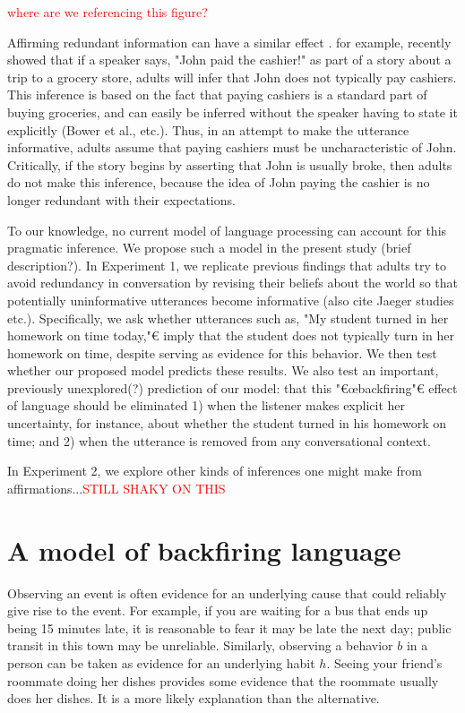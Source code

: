 \documentclass[10pt,letterpaper]{article}
\newcommand{\red}[1]{\textcolor{Red}{#1}}
\begin{document}
\red{where are we referencing this figure?}

Affirming redundant information can have a similar effect \cite{Gruenfeld1992, Kravtchenko2015}.  
 for example, recently showed that if a speaker says, "John paid the cashier!" as part of a story about a trip to a grocery store, adults will infer that John does not typically pay cashiers.  This inference is based on the fact that paying cashiers is a standard part of buying groceries, and can easily be inferred without the speaker having to state it explicitly (Bower et al., etc.).  Thus, in an attempt to make the utterance informative, adults assume that paying cashiers must be uncharacteristic of John.  Critically, if the story begins by asserting that John is usually broke, then adults do not make this inference, because the idea of John paying the cashier is no longer redundant with their expectations.

To our knowledge, no current model of language processing can account for this pragmatic inference.  We propose such a model in the present study (brief description?).  In Experiment 1, we replicate previous findings that adults try to avoid redundancy in conversation by revising their beliefs about the world so that potentially uninformative utterances become informative \cite{Kravtchenko2015} (also cite Jaeger studies etc.).  Specifically, we ask whether utterances such as, "My student turned in her homework on time today,"€ imply that the student does not typically turn in her homework on time, despite serving as evidence for this behavior.  We then test whether our proposed model predicts these results.  We also test an important, previously unexplored(?) prediction of our model: that this "€œbackfiring"€ effect of language should be eliminated 1) when the listener makes explicit her uncertainty, for instance, about whether the student turned in his homework on time; and 2) when the utterance is removed from any conversational context.

In Experiment 2, we explore other kinds of inferences one might make from affirmations...\red{STILL SHAKY ON THIS}



\section{A model of backfiring language}

Observing an event is often evidence for an underlying cause that could reliably give rise to the event.
For example, if you are waiting for a bus that ends up being 15 minutes late, it is reasonable to fear it may be late the next day; public transit in this town may be unreliable. 
Similarly, observing a behavior $b$ in a person can be taken as evidence for an underlying habit $h$. 
Seeing your friend's roommate doing her dishes provides some evidence that the roommate usually does her dishes. 
It is a more likely explanation than the alternative.
\end{document}
